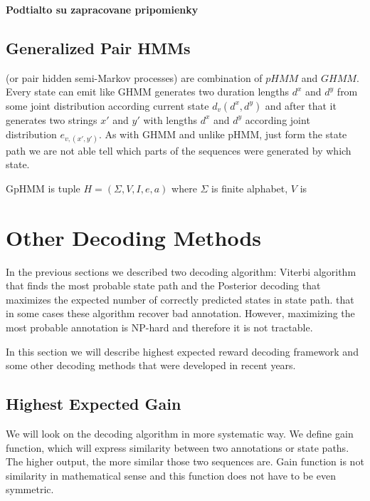 \bigskip
{\large\bf Podtialto su zapracovane pripomienky}
\bigskip


\subsection{Generalized Pair HMMs}


 (or pair hidden semi-Markov
processes) are combination of $pHMM$ and $GHMM$.  Every state can emit like GHMM
generates two duration lengths $d^x$ and $d^y$ from some joint distribution
according current state $d_v(d^x,d^y)$ and after that it generates two strings
$x'$ and $y'$ with lengths $d^x$ and $d^y$ according joint distribution
$e_{v,(x',y')}$.  As with GHMM and unlike pHMM, just form the state path we are
not able tell which parts of the sequences were generated by which state. 

\begin{definition}
GpHMM is tuple $H=(\Sigma,V,I,e,a)$ where $\Sigma$ is finite alphabet, $V$ is 
\end{definition}

\section{Other Decoding Methods}
In the previous sections we described two decoding algorithm: Viterbi algorithm
that finds the most probable state path  and the Posterior decoding that
maximizes the expected number of correctly predicted states in state path.
 that in some cases these algorithm
recover bad annotation. However, maximizing the most probable annotation is
NP-hard and therefore it is not tractable.

In this section we will describe highest expected reward decoding framework and
some other decoding methods that were developed in recent years.

\subsection{Highest Expected Gain}

We will look on the decoding algorithm in more systematic way. We define gain
function, which will express similarity between
two annotations or state paths. The higher output, the more
similar those two sequences are. Gain function is not similarity in mathematical
sense and this function does not have to be even symmetric. 

